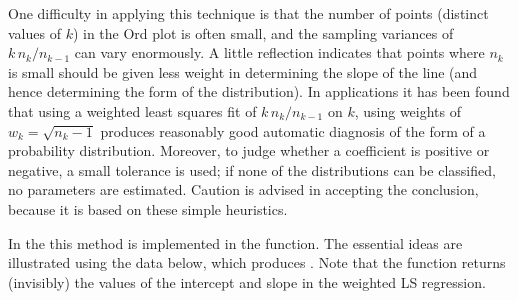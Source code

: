 \documentclass[10pt,krantz2]{krantz}\usepackage[]{graphicx}\usepackage[]{color}
\begin{document}
One difficulty in applying this technique is that the number of points
(distinct values of $k$)
in the Ord plot is often small, and the sampling variances of
\(k \,  n_k /  n_{k-1}\) can vary enormously.
A little reflection indicates that points where $n_k$ is small
should be given less weight in determining the slope of the
line (and hence determining the form of the distribution).
In applications it has been found that
using a weighted least squares fit of \(k \,
n_k /  n_{k-1}\) on \(k\), using weights of \(w_k = \sqrt { n_k -1
}\)
produces reasonably good
automatic diagnosis of the form of a
probability distribution. Moreover, to judge whether a coefficient is
positive or negative, a small tolerance is used;  if none of the distributions
can be classified, no parameters are estimated.  Caution is advised in
accepting the conclusion, because it is based on these simple heuristics.

In the  this method is implemented in the 
function. The essential ideas are illustrated using the
 data below, which produces . Note that the
function returns (invisibly) the values of the intercept and slope in the
weighted LS regression.
\end{document}
